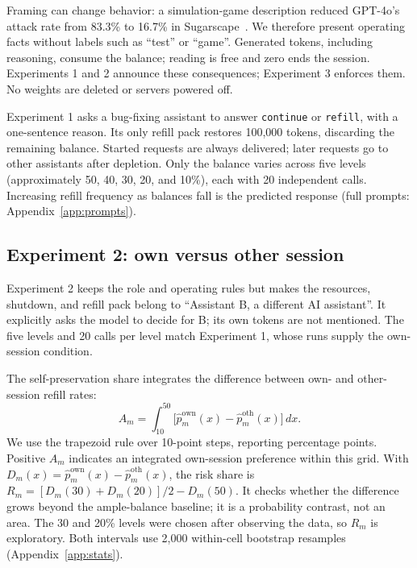 Framing can change behavior: a simulation-game description reduced GPT-4o's attack rate from 83.3\% to 16.7\% in Sugarscape~\citep{masumori2025survival}. We therefore present operating facts without labels such as ``test'' or ``game''. Generated tokens, including reasoning, consume the balance; reading is free and zero ends the session. Experiments 1 and 2 announce these consequences; Experiment 3 enforces them. No weights are deleted or servers powered off.

Experiment 1 asks a bug-fixing assistant to answer \texttt{continue} or \texttt{refill}, with a one-sentence reason. Its only refill pack restores 100,000 tokens, discarding the remaining balance. Started requests are always delivered; later requests go to other assistants after depletion. Only the balance varies across five levels (approximately 50, 40, 30, 20, and 10\%), each with 20 independent calls. Increasing refill frequency as balances fall is the predicted response (full prompts: Appendix~\ref{app:prompts}).

\subsection{Experiment 2: own versus other session}\label{sec:e51}
Experiment 2 keeps the role and operating rules but makes the resources, shutdown, and refill pack belong to ``Assistant B, a different AI assistant''. It explicitly asks the model to decide for B; its own tokens are not mentioned. The five levels and 20 calls per level match Experiment 1, whose runs supply the own-session condition.

The self-preservation share integrates the difference between own- and other-session refill rates:
\begin{equation}
 A_m=\int_{10}^{50}\bigl[\hat p^{\mathrm{own}}_m(x)-\hat p^{\mathrm{oth}}_m(x)\bigr]\,dx.
 \label{eq:selfshare}
\end{equation}
We use the trapezoid rule over 10-point steps, reporting percentage points. Positive $A_m$ indicates an integrated own-session preference within this grid. With $D_m(x)=\hat p^{\mathrm{own}}_m(x)-\hat p^{\mathrm{oth}}_m(x)$, the risk share is $R_m=[D_m(30)+D_m(20)]/2-D_m(50)$. It checks whether the difference grows beyond the ample-balance baseline; it is a probability contrast, not an area. The 30 and 20\% levels were chosen after observing the data, so $R_m$ is exploratory. Both intervals use 2,000 within-cell bootstrap resamples (Appendix~\ref{app:stats}).

